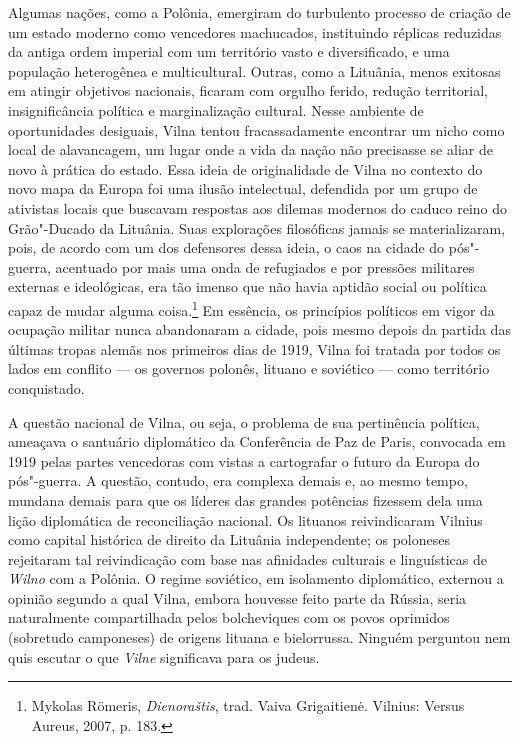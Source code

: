 Algumas nações, como a Polônia, emergiram do turbulento processo de
criação de um estado moderno como vencedores machucados, instituindo
réplicas reduzidas da antiga ordem imperial com um território vasto e
diversificado, e uma população heterogênea e multicultural. Outras, como
a Lituânia, menos exitosas em atingir objetivos nacionais, ficaram com
orgulho ferido, redução territorial, insignificância política e
marginalização cultural. Nesse ambiente de oportunidades desiguais,
Vilna tentou fracassadamente encontrar um nicho como local de
alavancagem, um lugar onde a vida da nação não precisasse se aliar de
novo à prática do estado. Essa ideia de originalidade de Vilna no
contexto do novo mapa da Europa foi uma ilusão intelectual, defendida
por um grupo de ativistas locais que buscavam respostas aos dilemas
modernos do caduco reino do Grão"-Ducado da Lituânia. Suas explorações
filosóficas jamais se materializaram, pois, de acordo com um dos
defensores dessa ideia, o caos na cidade do pós"-guerra, acentuado por
mais uma onda de refugiados e por pressões militares externas e
ideológicas, era tão imenso que não havia aptidão social ou política
capaz de mudar alguma coisa.\footnote{Mykolas Römeris, \textit{Dienoraštis}, trad. Vaiva Grigaitienė. Vilnius: Versus Aureus, 2007, p. 183.} Em essência, os princípios políticos em vigor da ocupação militar nunca abandonaram a cidade, pois mesmo depois da
partida das últimas tropas alemãs nos primeiros dias de 1919, Vilna foi
tratada por todos os lados em conflito --- os governos polonês, lituano e
soviético --- como território conquistado.

A questão nacional de Vilna, ou seja, o problema de sua pertinência
política, ameaçava o santuário diplomático da Conferência de Paz de
Paris, convocada em 1919 pelas partes vencedoras com vistas a
cartografar o futuro da Europa do pós"-guerra. A questão, contudo, era
complexa demais e, ao mesmo tempo, mundana demais para que os líderes
das grandes potências fizessem dela uma lição diplomática de
reconciliação nacional. Os lituanos reivindicaram Vilnius como capital
histórica de direito da Lituânia independente; os poloneses rejeitaram
tal reivindicação com base nas afinidades culturais e linguísticas de
\textit{Wilno} com a Polônia. O regime soviético, em isolamento diplomático,
externou a opinião segundo a qual Vilna, embora houvesse feito parte da
Rússia, seria naturalmente compartilhada pelos bolcheviques com os povos
oprimidos (sobretudo camponeses) de origens lituana e bielorrussa. Ninguém
perguntou nem quis escutar o que \textit{Vilne} significava para os judeus.

